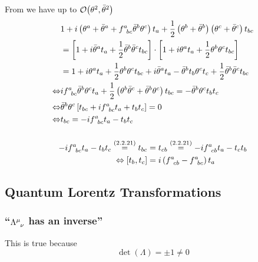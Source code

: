 \subsubsection{ }
From  we have up to $\order{\theta^2,\bar{\theta}^2}$
\begin{align*} 
	&1+i\left(\theta^a+\bar{\theta}^a+f^a_{\hphantom{a} bc}\bar{\theta}^b\theta^c\right)t_a+
	\dfrac{1}{2}\left(\theta^b+\bar{\theta}^b\right)\left(\theta^c+\bar{\theta}^c\right)t_{bc}\\
	&=\left[1+i\bar{\theta}^a t_a+\dfrac{1}{2}\bar{\theta}^b\bar{\theta}^c t_{bc}\right]\cdot\left[1+i{\theta}^a t_a+\dfrac{1}{2}{\theta}^b{\theta}^c t_{bc}\right]\\
	&=1+i{\theta}^a t_a+\dfrac{1}{2}{\theta}^b{\theta}^c t_{bc}+i\bar{\theta}^a t_a-\bar{\theta}^b t_b \theta^c t_c+\dfrac{1}{2}\bar{\theta}^b\bar{\theta}^c t_{bc}\\
	\Leftrightarrow &i f^a_{\hphantom{a} bc}\bar{\theta}^b\theta^c t_a + \dfrac{1}{2}\left(\theta^b \bar{\theta}^c+ \bar{\theta}^b\theta^c\right)t_{bc}=-\bar{\theta}^b  \theta^c t_b t_c\\
	\Leftrightarrow&\bar{\theta}^b\theta^c\left[t_{bc}+ i f^a_{\hphantom{a} bc} t_a+t_b t_c\right]=0\\
	\Leftrightarrow& t_{bc}=- i f^a_{\hphantom{a} bc} t_a-t_b t_c
\end{align*}

\subsubsection{ }
\begin{align*} 
	- i f^a_{\hphantom{a} bc} t_a-t_b t_c \overset{\eqc{2.2.21}}{=}t_{bc}&=t_{cb} \overset{\eqc{2.2.21}}{=} - i f^a_{\hphantom{a} cb} t_a-t_c t_b\\
	\Leftrightarrow\commutator{t_b}{t_c}&=i\left(f^a_{\hphantom{a} cb}-f^a_{\hphantom{a} bc}\right)t_a
\end{align*}


\subsection{Quantum Lorentz Transformations}\label{susec:2_3}
\subsubsection{\enquote{$\Lambda^\mu_{\hphantom{\mu}\nu}$ has an \textbf{inverse}} }
This is true because \[\det(\Lambda)=\pm 1\neq 0\]

